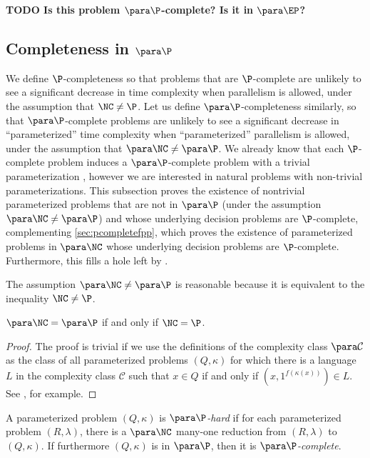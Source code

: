 \documentclass{article}
\newcommand{\todo}[1]{\textbf{TODO #1}}
\begin{document}
\todo{Is this problem $\para \P$-complete? Is it in $\para \EP$?}

\subsection{Completeness in \texorpdfstring{$\para \P$}{paraP}}

We define $\P$-completeness so that problems that are $\P$-complete are unlikely to see a significant decrease in time complexity when parallelism is allowed, under the assumption that $\NC \neq \P$.
Let us define $\para \P$-completeness similarly, so that $\para \P$-complete problems are unlikely to see a significant decrease in ``parameterized'' time complexity when ``parameterized'' parallelism is allowed, under the assumption that $\para \NC \neq \para \P$.
We already know that each $\P$-complete problem induces a $\para \P$-complete problem with a trivial parameterization \autocite[Proposition~14]{fg03}, however we are interested in natural problems with non-trivial parameterizations.
This subsection proves the existence of nontrivial parameterized problems that are not in $\para \P$ (under the assumption $\para \NC \neq \para \P$) and whose underlying decision problems are $\P$-complete, complementing \autoref{sec:pcompletefpp}, which proves the existence of parameterized problems in $\para \NC$ whose underlying decision problems are $\P$-complete.
Furthermore, this fills a hole left by \autocite{est15}.

The assumption $\para \NC \neq \para \P$ is reasonable because it is equivalent to the inequality $\NC \neq \P$.

\begin{proposition}
  $\para \NC = \para \P$ if and only if $\NC = \P$.
\end{proposition}
\begin{proof}
  The proof is trivial if we use the definitions of the complexity class $\para \mathcal{C}$ as the class of all parameterized problems $(Q, \kappa)$ for which there is a language $L$ in the complexity class $\mathcal{C}$ such that $x \in Q$ if and only if $(x, 1^{f(\kappa(x))}) \in L$.
  See \autocite[Proposition~8]{fg03}, for example.
\end{proof}

\begin{definition}
  A parameterized problem $(Q, \kappa)$ is \emph{$\para \P$-hard} if for each parameterized problem $(R, \lambda)$, there is a $\para \NC$ many-one reduction from $(R, \lambda)$ to $(Q, \kappa)$.
  If furthermore $(Q, \kappa)$ is in $\para \P$, then it is \emph{$\para \P$-complete}.
\end{definition}
\end{document}
